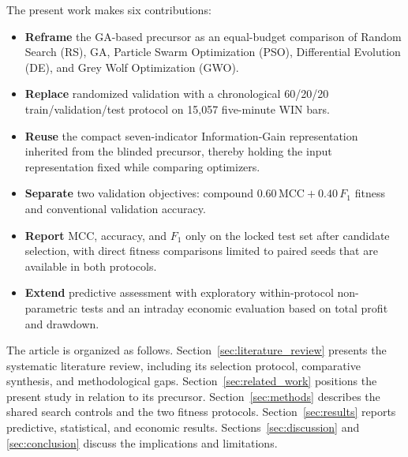 The present work makes six contributions:

\begin{itemize}
    \item \textbf{Reframe} the GA-based precursor as an equal-budget comparison of Random Search (RS), GA, Particle Swarm Optimization (PSO), Differential Evolution (DE), and Grey Wolf Optimization (GWO).
    \item \textbf{Replace} randomized validation with a chronological 60/20/20 train/validation/test protocol on 15,057 five-minute WIN bars.
    \item \textbf{Reuse} the compact seven-indicator Information-Gain representation inherited from the blinded precursor, thereby holding the input representation fixed while comparing optimizers.
    \item \textbf{Separate} two validation objectives: compound $0.60\,\mathrm{MCC}+0.40\,F_1$ fitness and conventional validation accuracy.
    \item \textbf{Report} MCC, accuracy, and $F_1$ only on the locked test set after candidate selection, with direct fitness comparisons limited to paired seeds that are available in both protocols.
    \item \textbf{Extend} predictive assessment with exploratory within-protocol non-parametric tests and an intraday economic evaluation based on total profit and drawdown.
\end{itemize}

The article is organized as follows. Section~\ref{sec:literature_review} presents the systematic literature review, including its selection protocol, comparative synthesis, and methodological gaps. Section~\ref{sec:related_work} positions the present study in relation to its precursor. Section~\ref{sec:methods} describes the shared search controls and the two fitness protocols. Section~\ref{sec:results} reports predictive, statistical, and economic results. Sections~\ref{sec:discussion} and \ref{sec:conclusion} discuss the implications and limitations.
